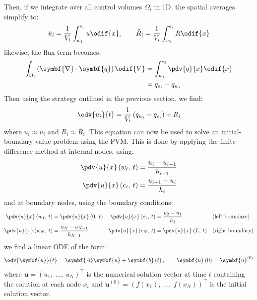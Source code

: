\documentclass{article}
\begin{document}
Then, if we integrate over all control volumes \(\Omega_i\) in 1D, the
spatial averages simplify to:
\begin{equation*}
    \bar{u}_i = \frac{1}{V_i} \int_{w_i}^{e_i} u \odif{x}, \qquad \bar{R}_i = \frac{1}{V_i} \int_{w_i}^{e_i} R \odif{x}
\end{equation*}
likewise, the flux term becomes,
\begin{align*}
    \int_{\Omega_i} \left( \symbf{\nabla} \cdot \symbf{q} \right) \odif{V} & = \int_{w_i}^{e_i} \pdv{q}{x} \odif{x} \\
                                                                           & = q_{e_i} - q_{w_i}
\end{align*}
Then using the strategy outlined in the previous section, we find:
\begin{equation*}
    \odv{u_i}{t} = \frac{1}{V_i} \left( q_{w_i} - q_{e_i} \right) + R_i
\end{equation*}
where \(u_i \approx \bar{u}_i\) and \(R_i \approx \bar{R}_i\). This equation
can now be used to solve an initial-boundary value problem using the FVM.
This is done by applying the finite-difference method at internal nodes,
using:
\begin{align*}
    \pdv{u}{x}\left( w_i,\: t \right) & = \frac{u_i - u_{i-1}}{h_{i-1}} \\
    \pdv{u}{x}\left( e_i,\: t \right) & = \frac{u_{i+1} - u_i}{h_i}
\end{align*}
and at boundary nodes, using the boundary conditions:
\begin{align*}
    \pdv{u}{x}\left( w_1,\: t \right) & = \pdv{u}{x}\left( 0,\: t \right) & \pdv{u}{x}\left( e_1,\: t \right) & = \frac{u_2 - u_1}{h_1}           &  & \text{(left boundary)}  \\
    \pdv{u}{x}\left( w_N,\: t \right) & = \frac{u_N - u_{N-1}}{h_{N-1}}   & \pdv{u}{x}\left( e_N,\: t \right) & = \pdv{u}{x}\left( L,\: t \right) &  & \text{(right boundary)}
\end{align*}
we find a linear ODE of the form:
\begin{equation*}
    \odv{\symbf{u}}{t} = \symbf{A} \symbf{u} + \symbf{b}\left( t \right), \qquad \symbf{u}\left( 0 \right) = \symbf{u}^{\left( 0 \right)}
\end{equation*}
where \(\symbf{u} = {\left( u_1,\: \dots,\: u_N \right)}^\top\) is the
numerical solution vector at time \(t\) containing the solution at each
node \(x_i\) and \(\symbf{u}^{\left( 0 \right)} = {\left( f\left( x_1 \right),\: \dots,\: f\left( x_N \right) \right)}^\top\)
is the initial solution vector.
\end{document}
